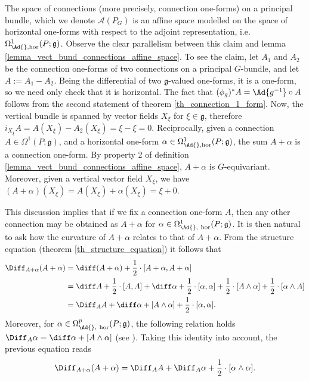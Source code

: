 \begin{obs} \label{ex_connection_1_forms_horizontal}
    The space of connections (more precisely, connection one-forms) on a principal bundle, which we denote \(\mathscr{A}(P_G)\) is an affine space modelled on the space of horizontal one-forms with respect to the adjoint representation, i.e. \(\Omega^1_{\Ad{}, \mathrm{hor}}(P; \mathfrak{g})\). Observe the clear parallelism between this claim and lemma \ref{lemma_vect_bund_connections_affine_space}. To see the claim, let \(A_1\) and \(A_2\) be the connection one-forms of two connections on a principal \(G\)-bundle, and let \(A:=A_1-A_2\). Being the differential of two \(\mathfrak{g}\)-valued one-forms, it is a one-form, so we need only check that it is horizontal. The fact that \((\phi_g)^*A=\Ad{g^{-1}}\circ A\) follows from the second statement of theorem \ref{th_connection_1_form}. Now, the vertical bundle is spanned by vector fields \(X_\xi\) for \(\xi \in \mathfrak{g}\), therefore \(i_{X_\xi}A=A(X_\xi)-A_2(X_\xi)=\xi-\xi=0\). Reciprocally, given a connection \(A \in \Omega^1(P; \mathfrak{g})\), and a horizontal one-form \(\alpha \in \Omega^1_{\Ad{}, \mathrm{hor}}(P;\mathfrak{g})\), the sum \(A+\alpha\) is a connection one-form. By property 2 of definition \ref{lemma_vect_bund_connections_affine_space}, \(A+\alpha\) is \(G\)-equivariant. Moreover, given a vertical vector field \(X_\xi\), we have \((A+\alpha)(X_\xi)=A(X_\xi)+\alpha(X_\xi)=\xi+0\). \newline \newline

    This discussion implies that if we fix a connection one-form \(A\), then any other connection may be obtained as \(A+\alpha\) for \(\alpha \in \Omega^1_{\Ad{}, \ \mathrm{hor}}(P; \mathfrak{g})\). It is then natural to ask how the curvature of \(A+\alpha\) relates to that of \(A+\alpha\). From the structure equation (theorem \ref{th_structure_equation}) it follows that 
    \begin{equation*} 
        \begin{split}
    \Diff_{A+\alpha}(A+\alpha)&  = \diff(A+\alpha) + \frac{1}{2}\cdot [A+\alpha, A+\alpha] \\
    &=\diff A + \frac{1}{2}\cdot [A,A] + \diff \alpha + \frac{1}{2}\cdot [\alpha, \alpha] + \frac{1}{2}\cdot [A \wedge \alpha] + \frac{1}{2}\cdot [\alpha \wedge A] \\
    & = \Diff_A A + \diff \alpha + [A \wedge \alpha] +\frac{1}{2}\cdot [\alpha, \alpha].
        \end{split}
    \end{equation*}
    Moreover, for \(\alpha \in \Omega_{\Ad{}, \ \text{hor}}^p(P; \mathfrak{g})\), the following relation holds \(\Diff_A \alpha=\diff \alpha + [A \wedge \alpha]\) (see \parencite[Remark 1.4.12]{Rudolph_2017pug}). Taking this identity into account, the previous equation reads
    \begin{equation} \label{eq_rel_curvature}
    \Diff_{A+ \alpha}(A+\alpha) = \Diff_AA + \Diff_A \alpha  + \frac{1}{2}\cdot [\alpha \wedge \alpha].
    \end{equation}
\end{obs}

